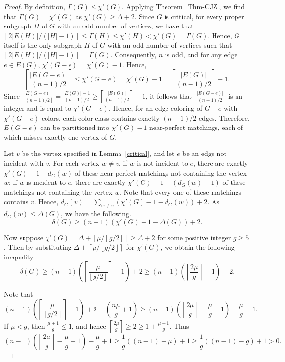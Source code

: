 \documentclass[10pt,a4paper]{amsart}
\newcommand\rounddown[1]{\left\lfloor#1\right\rfloor}
\newcommand\roundup[1]{\left\lceil#1\right\rceil}
\begin{document}
\begin{proof} By definition, $\Gamma(G) \le \chi'(G)$. Applying  Theorem~\ref{Thm-CJZ}, we find that $\Gamma(G)=\chi'(G)$ as $\chi'(G) \ge \Delta +2$. Since $G$ is critical, for every proper subgraph $H$ of $G$ with an odd number of vertices, we have that $\roundup{2|E(H)|/(|H|-1)} \le \Gamma(H) \le \chi'(H) < \chi'(G) = \Gamma(G)$.  Hence, $G$ itself is the only subgraph $H$ of $G$ with an odd number of vertices such that $\roundup{2|E(H)|/(|H|-1)} = \Gamma(G)$. Consequently, $n$ is odd, and for any edge $e\in E(G)$,
\( \chi'(G-e) =\chi'(G) -1\). Hence,
\[
 \roundup{\frac{|E(G-e)|}{(n-1)/2}} \le \chi'(G-e)= \chi'(G) -1 = \roundup{\frac{|E(G)|}{(n-1)/2}} -1.
\]
Since $\frac{|E(G-e)|}{\rounddown{(n-1)/2}} = \frac{|E(G)|-1}{(n-1)/2} \ge \roundup{\frac{|E(G)|}{(n-1)/2}} -1$, it follows that  $\frac{|E(G-e)|}{\rounddown{(n-1)/2}}$ is an integer and is equal to $\chi'(G-e)$. Hence, for an edge-coloring of $G-e$ with $\chi'(G-e)$ colors, each color class contains exactly $(n-1)/2$ edges. Therefore, \(E(G - e)\) can be partitioned into \(\chi'(G) - 1\) near-perfect matchings, each of which misses exactly one vertex of \(G\).

Let $v$ be the  vertex specified in Lemma~\ref{critical}, and  let $e$ be an edge not incident with $v$.  For each vertex $w\ne v$, if $w$ is not incident to $e$, there are exactly $\chi'(G) -1 -d_G(w)$ of these near-perfect matchings not containing the vertex $w$;  if $w$ is incident to $e$, there are exactly $\chi'(G) -1 -(d_G(w) -1)$ of these matchings  not containing the vertex $w$. Note that every one of these matchings contains $v$. Hence, $d_G(v)  = \sum_{w\ne v} (\chi'(G) -1 -d_G(w)) +2$. As $d_G(w) \le \Delta(G)$, we have the following.
\[
\delta(G) \ge (n-1)(\chi'(G) -1 -\Delta(G)) +2.
\]

Now suppose $\chi'(G)=\Delta + \roundup{\mu/\rounddown{g/2}}\geq \Delta + 2$ for some positive integer $g\geq 5$. Then by substituting $\Delta + \roundup{\mu/\rounddown{g/2}}$ for $\chi'(G)$, we obtain the following inequality.
\[
\delta(G) \ge (n-1)\left(\roundup{\frac{\mu}{\rounddown{g/2}}}-1\right) +2\ge (n-1)\left(\roundup{{\frac{2\mu}g}}-1\right) +2.
\]

Note that
\[
(n-1)\left(\roundup{\frac{\mu}{\rounddown{g/2}}}-1\right) +2 -  \left(\frac {n\mu}g +1\right)
\ge (n-1)\left(\roundup{\frac{2\mu}g}-\frac {\mu}g -1\right) -\frac {\mu}g +1.
\]
If $\mu <   g$, then $\frac {\mu +1}g \le 1$, and hence
$\roundup{\frac{2\mu}g} \ge 2 \ge 1+ \frac {\mu +1}g$. Thus,
\[
(n-1)\left(\roundup{\frac{2\mu}g}-\frac {\mu}g -1\right) -\frac {\mu}g +1 \ge \frac 1g ((n-1) -\mu) +1 \ge \frac 1g((n-1) -g) +1> 0.
\]


\end{proof}
\end{document}
